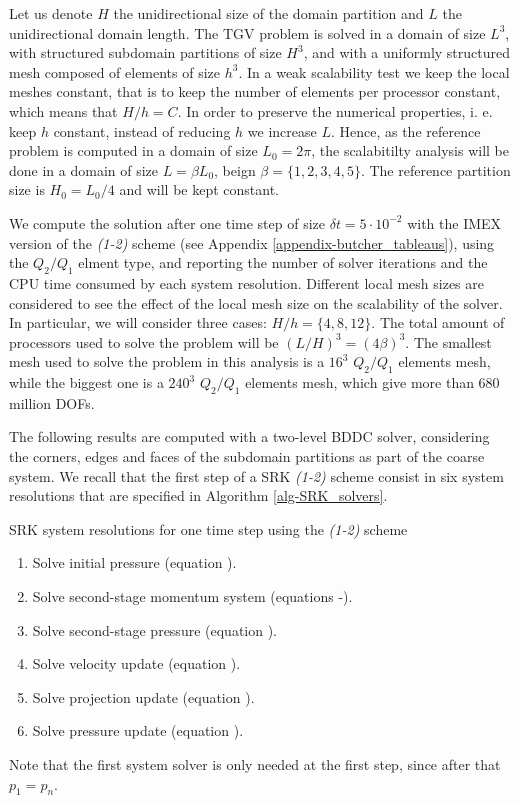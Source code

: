 Let us denote $ H $ the unidirectional size of the domain partition and $ L $ the unidirectional domain length. The TGV problem is solved in a domain of size $ L^3 $, with structured subdomain partitions of size $ H^3 $, and with a uniformly structured mesh composed of elements of size $ h^3 $. In a weak scalability test we keep the local meshes constant, that is to keep the number of elements per processor constant, which means that $ H/h= C $. In order to preserve the numerical properties, i. e. keep $ h $ constant, instead of reducing $ h $ we increase $ L $. Hence, as the reference problem is computed in a domain of size $ L_0=2\pi $, the scalabitilty analysis will be done in a domain of size $ L=\beta L_0 $, beign $ \beta=\{1,2,3,4,5\} $. The reference partition size is $ H_0=L_0/4 $ and will be kept constant.

We compute the solution after one time step of size $\delta t=5\cdot10^{-2}$ with the IMEX version of the \textit{(1-2)} scheme (see Appendix \ref{appendix-butcher_tableaus}), using the $ Q_2/Q_1 $ elment type, and reporting the number of solver iterations and the CPU time consumed by each system resolution. Different local mesh sizes are considered to see the effect of the local mesh size on the scalability of the solver. In particular, we will consider three cases: $ H/h=\{4,8,12\} $. The total amount of processors used to solve the problem will be $ (L/H)^3 = (4\beta)^3 $. The smallest mesh used to solve the problem in this analysis is a $ 16^3 $ $ Q_2/Q_1 $ elements mesh, while the biggest one is a $ 240^3 $ $ Q_2/Q_1 $ elements mesh, which give more than $ 680 $ million DOFs.

The following results are computed with a two-level BDDC solver, considering the corners, edges and faces of the subdomain partitions as part of the coarse system. We recall that the first step of a SRK \textit{(1-2)} scheme consist in six system resolutions that are specified in Algorithm \ref{alg-SRK_solvers}.
\begin{algorithm}
\caption{SRK system resolutions for one time step using the \textit{(1-2)} scheme}
\label{alg-SRK_solvers}
\begin{enumerate}
\item Solve initial pressure (equation ).
\item Solve second-stage momentum system (equations -).
\item Solve second-stage pressure (equation ).
\item Solve velocity update (equation ).
\item Solve projection update (equation ).
\item Solve pressure update (equation ).
\end{enumerate}
\end{algorithm}
Note that the first system solver is only needed at the first step, since after that $ p_1=p_n $.

